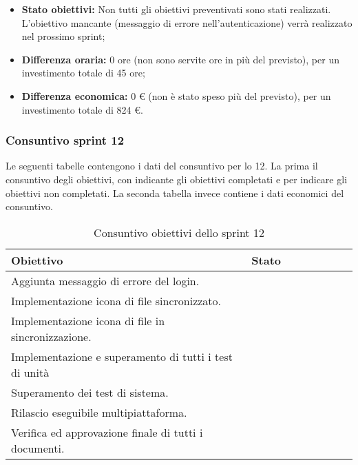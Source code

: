\begin{itemize}
	\item \textbf{Stato obiettivi:} Non tutti gli obiettivi preventivati sono stati realizzati. L'obiettivo mancante (messaggio di errore nell'autenticazione) verrà realizzato nel prossimo sprint;
	\item \textbf{Differenza oraria:} 0 ore (non sono servite ore in più del previsto), per un investimento totale di 45 ore;
	\item \textbf{Differenza economica:} 0 \euro{} (non è stato speso più del previsto), per un investimento totale di 824 \euro{}.
\end{itemize}


\subsubsection{Consuntivo sprint 12}
Le seguenti tabelle contengono i dati del consuntivo per lo  12. La prima il consuntivo degli obiettivi, con \checkmark{} indicante gli obiettivi completati e \xmark{} per indicare gli obiettivi non completati. La seconda tabella invece contiene i dati economici del consuntivo.\newline{}

\begin{table}[H]
		\begin{center}
			\setlength{\aboverulesep}{0pt}
			\setlength{\belowrulesep}{0pt}
			\setlength{\extrarowheight}{.75ex}
			\begin{tabular}{ l c c c c c c c }
				\rowcolor{AzzurroGruppo!30} 
				\textbf{Obiettivo} & \textbf{Stato} \\
				\toprule
				Aggiunta messaggio di errore del login. & \checkmark{} \\
				Implementazione icona di file sincronizzato. & \checkmark{} \\
				Implementazione icona di file in sincronizzazione. & \checkmark{} \\
				Implementazione e superamento di tutti i test di unità & \checkmark{} \\
				Superamento dei test di sistema. & \checkmark{} \\ 
				Rilascio eseguibile multipiattaforma. & \checkmark{} \\
				Verifica ed approvazione finale di tutti i documenti. & \checkmark{} \\
				\bottomrule
			\end{tabular}
			\caption{Consuntivo obiettivi dello sprint 12}
		\end{center}
	\end{table}
	
